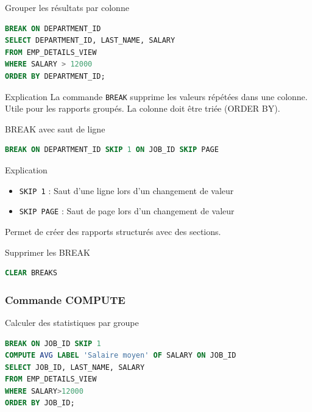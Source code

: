 \documentclass[12pt,a4paper]{article}
\begin{document}
\begin{commande}{Grouper les résultats par colonne}
\begin{lstlisting}[language=SQL]
BREAK ON DEPARTMENT_ID
SELECT DEPARTMENT_ID, LAST_NAME, SALARY
FROM EMP_DETAILS_VIEW
WHERE SALARY > 12000
ORDER BY DEPARTMENT_ID;
\end{lstlisting}
\end{commande}

\begin{explication}{Explication}
La commande \texttt{BREAK} supprime les valeurs répétées dans une colonne. Utile pour les rapports groupés. La colonne doit être triée (ORDER BY).
\end{explication}

\begin{commande}{BREAK avec saut de ligne}
\begin{lstlisting}[language=SQL]
BREAK ON DEPARTMENT_ID SKIP 1 ON JOB_ID SKIP PAGE
\end{lstlisting}
\end{commande}

\begin{explication}{Explication}
\begin{itemize}
    \item \texttt{SKIP 1} : Saut d'une ligne lors d'un changement de valeur
    \item \texttt{SKIP PAGE} : Saut de page lors d'un changement de valeur
\end{itemize}
Permet de créer des rapports structurés avec des sections.
\end{explication}

\begin{commande}{Supprimer les BREAK}
\begin{lstlisting}[language=SQL]
CLEAR BREAKS
\end{lstlisting}
\end{commande}

\subsubsection{Commande COMPUTE}

\begin{commande}{Calculer des statistiques par groupe}
\begin{lstlisting}[language=SQL]
BREAK ON JOB_ID SKIP 1
COMPUTE AVG LABEL 'Salaire moyen' OF SALARY ON JOB_ID
SELECT JOB_ID, LAST_NAME, SALARY
FROM EMP_DETAILS_VIEW
WHERE SALARY>12000
ORDER BY JOB_ID;
\end{lstlisting}
\end{commande}
\end{document}
